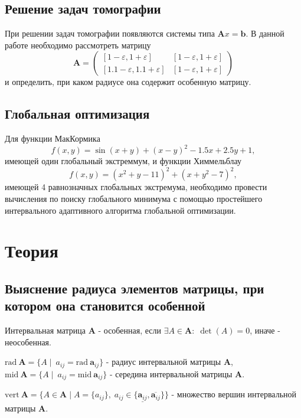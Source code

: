 \documentclass[a4paper]{article}
\begin{document}
\subsection{Решение задач томографии}
При решении задач томографии появляются системы типа $\mathbf{A}x=\mathbf{b}$. В данной работе необходимо рассмотреть матрицу 
\begin{equation}\label{math:tom}
\mathbf{A}=\begin{pmatrix}
  [1-\varepsilon,1+\varepsilon]& [1-\varepsilon,1+\varepsilon]\\
  [1.1-\varepsilon,1.1+\varepsilon]& [1-\varepsilon,1+\varepsilon]
\end{pmatrix}
\end{equation}
и определить, при каком радиусе она содержит особенную матрицу. 
\subsection{Глобальная оптимизация}
Для функции МакКормика
\begin{equation}\label{macCorm}
    f(x,y)=\sin(x+y)+(x-y)^2-1.5x+2.5y+1,
\end{equation}
имеющей один глобальный экстреммум, и функции Химмельблау
\begin{equation}\label{Himmel}
    f(x, y) = (x^2 + y - 11)^2 + (x + y^2 - 7)^2,
\end{equation}
имеющей 4 равнозначных глобальных экстремума, необходимо провести вычисления по поиску глобального минимума с помощью простейшего интервального адаптивного алгоритма глобальной оптимизации.
\section{Теория}
\subsection{Выяснение радиуса элементов матрицы, при котором она становится особенной}
Интервальная матрица $\mathbf{A}$ - особенная, если $\exists A\in\mathbf{A}:\;\det(A)=0$, иначе - неособенная. 

$\mathrm{rad}\:\mathbf{A}=\{A\mid\:a_{ij}=\mathrm{rad}\:\mathbf{a}_{ij}\}$ - радиус интервальной матрицы $\mathbf{A}$, $\mathrm{mid}\:\mathbf{A}=\{A\mid\:a_{ij}=\mathrm{mid}\:\mathbf{a}_{ij}\}$ - середина интервальной матрицы $\mathbf{A}$.

$\mathrm{vert}\:\mathbf{A}=\{A\in\mathbf{A}\mid A=\{a_{ij}\},\;a_{ij}\in\{\underline{\mathbf{a}_{ij}},\overline{\mathbf{a}_{ij}}\}\}$ - множество вершин интервальной матрицы $\mathbf{A}$. 
\end{document}

